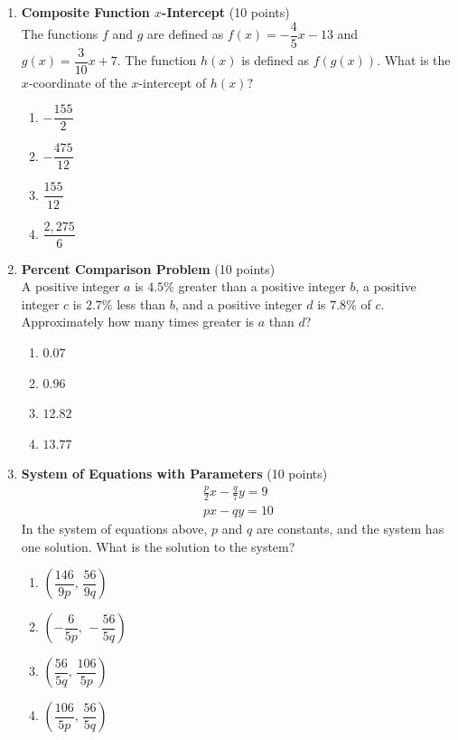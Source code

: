 \begin{enumerate}
  \item \textbf{Composite Function $x$-Intercept} (10 points)\\
  The functions $f$ and $g$ are defined as $f(x)=-\dfrac{4}{5} x-13$ and $g(x)=\dfrac{3}{10} x+7$. The function $h(x)$ is defined as $f(g(x))$. What is the $x$-coordinate of the $x$-intercept of $h(x)$?
  \begin{enumerate}[label=(\Alph*)]
    \item $-\dfrac{155}{2}$
    \item $-\dfrac{475}{12}$
    \item $\dfrac{155}{12}$
    \item $\dfrac{2,275}{6}$
  \end{enumerate}
  \begin{subanswer}
  \end{subanswer}




  \item \textbf{Percent Comparison Problem} (10 points)\\
  A positive integer $a$ is $4.5\%$ greater than a positive integer $b$, 
  a positive integer $c$ is $2.7\%$ less than $b$, and a positive integer 
  $d$ is $7.8\%$ of $c$. Approximately how many times greater is $a$ than $d$?
  \begin{enumerate}[label=(\Alph*)]
    \item $0.07$
    \item $0.96$
    \item $12.82$
    \item $13.77$
  \end{enumerate}
  \begin{subanswer}
  \end{subanswer}

  \item \textbf{System of Equations with Parameters} (10 points)\\
  $$
  \begin{gathered}
  \frac{p}{2} x-\frac{q}{7} y=9 \\
  p x-q y=10
  \end{gathered}
  $$
  In the system of equations above, $p$ and $q$ are constants, and the system has one solution. What is the solution to the system?
  \begin{enumerate}[label=(\Alph*)]
    \item $\left(\dfrac{146}{9p},\, \dfrac{56}{9q}\right)$
    \item $\left(-\dfrac{6}{5p},\, -\dfrac{56}{5q}\right)$
    \item $\left(\dfrac{56}{5q},\, \dfrac{106}{5p}\right)$
    \item $\left(\dfrac{106}{5p},\, \dfrac{56}{5q}\right)$
  \end{enumerate}
  \begin{subanswer}
  \end{subanswer}






\end{enumerate}
